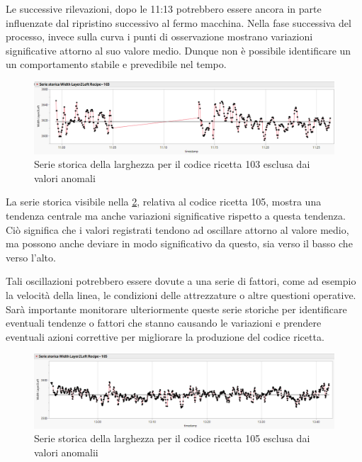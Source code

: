 Le successive rilevazioni, dopo le 11:13 potrebbero essere ancora in parte influenzate dal ripristino successivo al fermo macchina.
Nella fase successiva del processo, invece sulla curva i punti di osservazione mostrano variazioni significative attorno al suo valore medio. Dunque non è possibile identificare un un comportamento stabile e prevedibile nel tempo.


\begin{figure}[h]
  \centering
  \includegraphics[width=1\textwidth]{img/Rec103-Filtered-Time.png}
  \caption{Serie storica della larghezza per il codice ricetta 103 esclusa dai valori anomali}
  \label{fig:Rec103-Filtered-Time.png}
\end{figure}


La serie storica visibile nella \ref{fig:Rec105-Filtered-Time.png}, relativa al codice ricetta 105, mostra una tendenza centrale ma anche variazioni significative rispetto a questa tendenza. Ciò significa che i valori registrati tendono ad oscillare attorno al valore medio, ma possono anche deviare in modo significativo da questo, sia verso il basso che verso l'alto. 

Tali oscillazioni potrebbero essere dovute a una serie di fattori, come ad esempio la velocità della linea, le condizioni delle attrezzature o altre questioni operative. 
Sarà importante monitorare ulteriormente queste serie storiche per identificare eventuali tendenze o fattori che stanno causando le variazioni e prendere eventuali azioni correttive per migliorare la produzione del codice ricetta.

\begin{figure}[h]
  \centering
  \includegraphics[width=1\textwidth]{img/Rec105-Filtered-Time.png}
  \caption{Serie storica della larghezza per il codice ricetta 105 esclusa dai valori anomalii}
  \label{fig:Rec105-Filtered-Time.png}
\end{figure}


